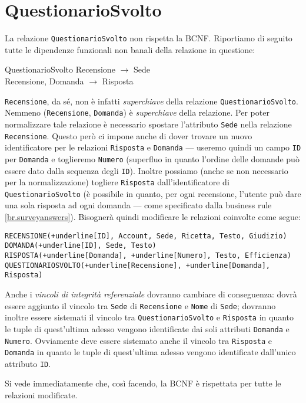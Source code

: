 \section{QuestionarioSvolto}\label{sec:questionariosvolto}
La relazione {\tt QuestionarioSvolto} non rispetta la BCNF. Riportiamo di seguito tutte
le dipendenze funzionali non banali della relazione in questione:
\begin{funcdep}{QuestionarioSvolto}
    Recensione $\to$ Sede\\
    Recensione, Domanda $\to$ Risposta
\end{funcdep}
\noindent\texttt{Recensione}, da sé, non è infatti {\it superchiave} della relazione {\tt QuestionarioSvolto}. Nemmeno
({\tt Recensione}, {\tt Domanda}) è {\it superchiave} della relazione.
Per poter normalizzare tale relazione è necessario spostare l'attributo {\tt Sede} nella
relazione {\tt Recensione}. Questo però ci impone anche di dover trovare un nuovo identificatore
per le relazioni {\tt Risposta} e {\tt Domanda} --- useremo quindi un campo {\tt ID} per {\tt Domanda} e
toglieremo {\tt Numero} (superfluo in quanto l'ordine delle domande può essere dato dalla sequenza
degli {\tt ID}). Inoltre possiamo (anche se non necessario per la normalizzazione)
togliere {\tt Risposta} dall'identificatore di {\tt QuestionarioSvolto} (è
possibile in quanto, per ogni recensione, l'utente può dare una sola risposta ad ogni
domanda --- come specificato dalla business rule \ref{br.surveyanswers}). Bisognerà
quindi modificare le relazioni coinvolte come segue:

\begin{Verbatim}[commandchars=+\[\]]
RECENSIONE(+underline[ID], Account, Sede, Ricetta, Testo, Giudizio)
DOMANDA(+underline[ID], Sede, Testo)
RISPOSTA(+underline[Domanda], +underline[Numero], Testo, Efficienza)
QUESTIONARIOSVOLTO(+underline[Recensione], +underline[Domanda], Risposta)
\end{Verbatim}
Anche i {\it vincoli di integrità referenziale} dovranno cambiare di conseguenza: dovrà
essere aggiunto il vincolo tra {\tt Sede} di {\tt Recensione} e {\tt Nome} di {\tt Sede}; dovranno
inoltre essere sistemati il vincolo tra {\tt QuestionarioSvolto} e {\tt Risposta} in quanto le tuple di quest'ultima
adesso vengono identificate dai soli attributi {\tt Domanda} e {\tt Numero}. Ovviamente deve essere
sistemato anche il vincolo tra {\tt Risposta} e {\tt Domanda} in quanto le tuple di quest'ultima adesso
vengono identificate dall'unico attributo {\tt ID}.

\vspace{10pt}
\noindent Si vede immediatamente che, così facendo, la BCNF è rispettata per tutte le relazioni modificate.
